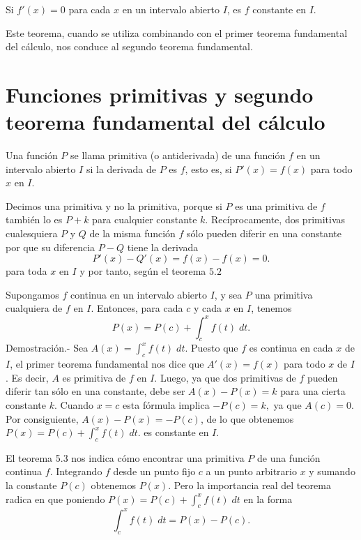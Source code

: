 \begin{teo}
    Si $f'(x)=0$ para cada $x$ en un intervalo abierto $I$, es $f$ constante en $I$.
\end{teo}
\vspace{0.5cm}

Este teorema, cuando se utiliza combinando con el primer teorema fundamental del cálculo, nos conduce al segundo teorema fundamental.

\section{Funciones primitivas y segundo teorema fundamental del cálculo}
\begin{def.}
    Una función $P$ se llama primitiva (o antiderivada) de una función $f$ en un intervalo abierto $I$ si la derivada de $P$ es $f$, esto es, si $P'(x)=f(x)$ para todo $x$ en $I.$
\end{def.}

Decimos una primitiva y no la primitiva, porque si $P$ es una primitiva de $f$ también lo es $P+k$ para cualquier constante $k$. Recíprocamente, dos primitivas cualesquiera $P$ y $Q$ de la misma función $f$ sólo pueden diferir en una constante por que su diferencia $P-Q$ tiene la derivada
$$P'(x)-Q'(x)=f(x)-f(x)=0.$$
para toda $x$ en $I$ y por tanto, según el teorema $5.2$

\begin{teo}
    Supongamos $f$ continua en un intervalo abierto $I$, y sea $P$ una primitiva cualquiera de $f$ en $I$. Entonces, para cada $c$ y cada $x$ en $I$, tenemos 
    $$P(x)=P(c)+\int_c^x f(t)\; dt.$$
	Demostración.-\; Sea $A(x)=\int_c^x f(t)\; dt$. Puesto que $f$ es continua en cada $x$ de $I$, el primer teorema fundamental nos dice que $A'(x)=f(x)$ para todo $x$ de $I$. Es decir, $A$ es primitiva de $f$ en $I$. Luego, ya que dos primitivas de $f$ pueden diferir tan sólo en una constante, debe ser $A(x)-P(x)=k$ para una cierta constante $k$. Cuando $x=c$ esta fórmula implica $-P(c)=k,$ ya que $A(c)=0.$ Por consiguiente, $A(x)-P(x)=-P(c)$, de lo que obtenemos $P(x)=P(c)+\int_c^x f(t)\; dt.$ es constante en $I$.
\end{teo}

El teorema 5.3 nos indica cómo encontrar una primitiva $P$ de una función continua $f$. Integrando $f$ desde un punto fijo $c$ a un punto arbitrario $x$ y sumando la constante $P(c)$ obtenemos $P(x)$. Pero la importancia real del teorema radica en que poniendo $P(x)=P(c)+\int_c^x f(t)\; dt$ en la forma
$$\int_c^x f(t)\; dt = P(x)-P(c).$$

